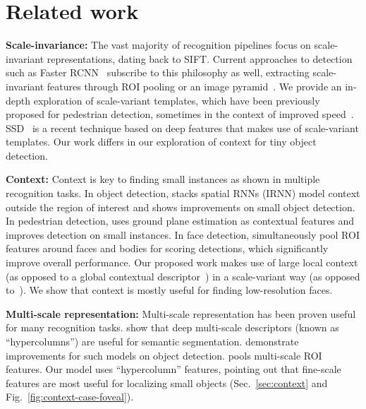 \documentclass[10pt,twocolumn,letterpaper]{article}
\begin{document}
\section{Related work}
\label{sec:related}

{\bf Scale-invariance:}  The vast majority of recognition pipelines focus on scale-invariant representations, dating back to SIFT\cite{lowe2004distinctive}.  Current approaches to detection such as Faster RCNN~\cite{ren2015faster} subscribe to this philosophy as well,  extracting scale-invariant features through ROI pooling or an image pyramid~\cite{ren2015object}. We provide an in-depth exploration of scale-variant templates, which have been previously proposed for pedestrian detection\cite{park2010multiresolution}, sometimes in the context of improved speed~\cite{benenson2012pedestrian}. SSD~\cite{liu2015ssd} is a recent technique based on deep features that makes use of scale-variant templates. Our work differs in our exploration of context for tiny object detection.

{\bf Context:} Context is key to finding small instances as shown in multiple recognition tasks.
In object detection, \cite{bell2015inside} stacks spatial RNNs (IRNN\cite{le2015simple}) model context outside the region of interest and shows improvements on small object detection. In pedestrian detection, \cite{park2010multiresolution} uses ground plane estimation as contextual features and improves detection on small instances. In face detection, \cite{zhu2016cms} simultaneously pool ROI features around faces and bodies for scoring detections, which significantly improve overall performance. Our proposed work makes use of large local context (as opposed to a global contextual descriptor~\cite{bell2015inside,park2010multiresolution}) in a scale-variant way (as opposed to~\cite{zhu2016cms}). We show that context is mostly useful for finding low-resolution faces. 

{\bf Multi-scale representation:} Multi-scale representation has been proven useful for many recognition tasks. \cite{hariharan2015hypercolumns,long2015fully,BansalChen16} show that deep multi-scale descriptors (known as ``hypercolumns'') are useful for semantic segmentation. \cite{bell2015inside,liu2015ssd} demonstrate improvements for such models on object detection. \cite{zhu2016cms} pools multi-scale ROI features. Our model uses ``hypercolumn'' features, pointing out that fine-scale features are most useful for localizing small objects (Sec.~\ref{sec:context} and Fig.~\ref{fig:context-case-foveal}). 
\end{document}
